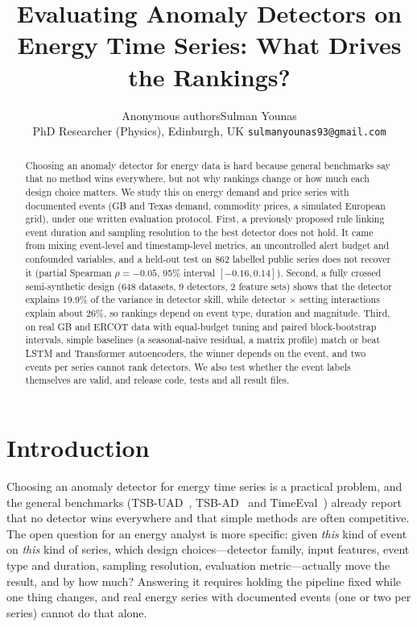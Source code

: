 \documentclass[10pt,twocolumn]{article}
\title{\vspace{-1.0em}Evaluating Anomaly Detectors on Energy Time Series: What Drives the Rankings?\vspace{-0.4em}}
\author{\ifanon Anonymous authors\else Sulman Younas\\ \small PhD Researcher (Physics), Edinburgh, UK \quad \texttt{sulmanyounas93@gmail.com}\fi}
\date{}
\begin{document}
\maketitle
\vspace{-1.2em}

\begin{abstract}
Choosing an anomaly detector for energy data is hard because general benchmarks say that no method wins everywhere, but not why rankings change or how much each design choice matters. We study this on energy demand and price series with documented events (GB and Texas demand, commodity prices, a simulated European grid), under one written evaluation protocol. First, a previously proposed rule linking event duration and sampling resolution to the best detector does not hold. It came from mixing event-level and timestamp-level metrics, an uncontrolled alert budget and confounded variables, and a held-out test on 862 labelled public series does not recover it (partial Spearman $\rho=-0.05$, 95\% interval $[-0.16, 0.14]$). Second, a fully crossed semi-synthetic design (648 datasets, 9 detectors, 2 feature sets) shows that the detector explains 19.9\% of the variance in detector skill, while detector $\times$ setting interactions explain about 26\%, so rankings depend on event type, duration and magnitude. Third, on real GB and ERCOT data with equal-budget tuning and paired block-bootstrap intervals, simple baselines (a seasonal-naive residual, a matrix profile) match or beat LSTM and Transformer autoencoders, the winner depends on the event, and two events per series cannot rank detectors. We also test whether the event labels themselves are valid, and release code, tests and all result files.
\end{abstract}

\section{Introduction}
Choosing an anomaly detector for energy time series is a practical problem, and the general benchmarks (TSB-UAD~\cite{paparrizos2022tsb}, TSB-AD~\cite{liu2024elephant} and TimeEval~\cite{schmidl2022comprehensive,wenig2022timeeval}) already report that no detector wins everywhere and that simple methods are often competitive. The open question for an energy analyst is more specific: given \emph{this} kind of event on \emph{this} kind of series, which design choices---detector family, input features, event type and duration, sampling resolution, evaluation metric---actually move the result, and by how much? Answering it requires holding the pipeline fixed while one thing changes, and real energy series with documented events (one or two per series) cannot do that alone.
\end{document}
